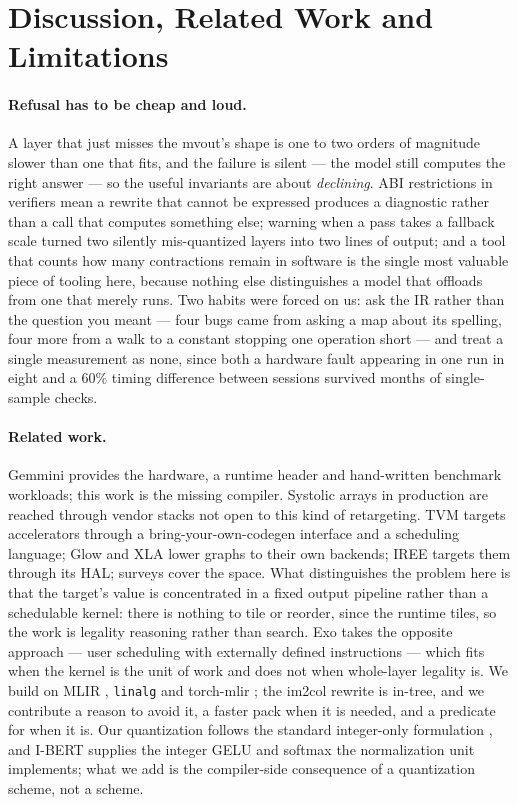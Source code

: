 \documentclass[runningheads]{llncs}
\begin{document}
\section{Discussion, Related Work and Limitations}

\paragraph{Refusal has to be cheap and loud.} A layer that just misses the mvout's shape is one to two orders of magnitude
slower than one that fits, and the failure is silent --- the model still computes
the right answer --- so the useful invariants are about \emph{declining}. ABI
restrictions in verifiers mean a rewrite that cannot be expressed produces a
diagnostic rather than a call that computes something else; warning when a pass
takes a fallback scale turned two silently mis-quantized layers into two lines of
output; and a tool that counts how many contractions remain in software is the
single most valuable piece of tooling here, because nothing else distinguishes a
model that offloads from one that merely runs. Two habits were forced on us: ask the IR rather than the question you meant ---
four bugs came from asking a map about its spelling, four more from a walk to a
constant stopping one operation short --- and treat a single measurement as
none, since both a hardware fault appearing in one run in eight and a 60\%
timing difference between sessions survived months of single-sample checks.

\paragraph{Related work.} Gemmini \cite{gemmini} provides the hardware, a runtime
header and hand-written benchmark workloads; this work is the missing compiler.
Systolic arrays \cite{tpu,eyeriss} in production are reached through vendor stacks
not open to this kind of retargeting. TVM \cite{tvm} targets accelerators through a
bring-your-own-codegen interface and a scheduling language; Glow \cite{glow} and
XLA \cite{xla} lower graphs to their own backends; IREE \cite{iree} targets them
through its HAL; surveys \cite{dlcsurvey} cover the space. What distinguishes the
problem here is that the target's value is concentrated in a fixed output pipeline
rather than a schedulable kernel: there is nothing to tile or reorder, since the
runtime tiles, so the work is legality reasoning rather than search. Exo
\cite{exo} takes the opposite approach --- user scheduling with externally defined
instructions --- which fits when the kernel is the unit of work and does not when
whole-layer legality is. We build on MLIR \cite{mlir}, \texttt{linalg}
\cite{linalgcodegen} and torch-mlir \cite{torchmlir}; the im2col rewrite
\cite{im2col} is in-tree, and we contribute a reason to avoid it, a faster pack
when it is needed, and a predicate for when it is. Our quantization follows the
standard integer-only formulation \cite{jacob,krishnamoorthi}, and I-BERT
\cite{ibert} supplies the integer GELU and softmax the normalization unit
implements; what we add is the compiler-side consequence of a quantization scheme,
not a scheme.
\end{document}
